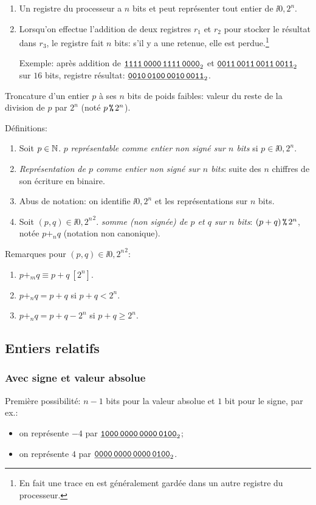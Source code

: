 \begin{enumerate}
\item Un registre du processeur a $n$ bits et peut
  représenter tout entier de $\ii{0,2^{n}}$.
\item Lorsqu'on effectue l'addition de deux registres $r_{1}$ et
  $r_{2}$ pour stocker le résultat dans $r_{3}$, le registre fait $n$
  bits: s'il y a une retenue, elle est perdue.\footnote{En fait une
    trace en est généralement gardée dans un autre registre du
    processeur.}

  Exemple: après addition de $\underline{\text{\texttt{1111\,0000\,1111\,0000}}}_{2}$ et
  $\underline{\text{\texttt{0011\,0011\,0011\,0011}}}_{2}$ sur $16$ bits, registre résultat:
  $\underline{\text{\texttt{0010\,0100\,0010\,0011}}}_{2}$.
\end{enumerate}

Troncature d'un entier $p$ à ses $n$ bits de poids faibles: valeur du
reste de la division de $p$ par $2^{n}$ (noté $p \operatorname{\texttt{\%}} 2^{n}$).

Définitions:
\begin{enumerate}
\item Soit $p\in\mathbb{N}$. $p$ \emph{représentable comme
    entier non signé sur $n$ bits} si $p\in\ii{0,2^{n}}$.
\item \emph{Représentation de $p$ comme entier non signé sur $n$
    bits}:
  suite des $n$ chiffres de son écriture en binaire.
\item Abus de notation: on identifie $\ii{0,2^{n}}$ et les
  représentations sur $n$ bits.
\item Soit $(p,q)\in \ii{0,2^{n}}^{2}$.
  \emph{somme (non signée) de $p$ et $q$ sur $n$ bits}: $(p+q) \operatorname{\texttt{\%}}
  2^{n}$, notée $p+_{n}q$ (notation non canonique).
\end{enumerate}

Remarques pour $(p,q)\in \ii{0,2^{n}}^{2}$:
  \begin{enumerate}
  \item $p+_{m}q \equiv p+q\ [2^{n}]$.
  \item $p+_{n}q = p+q$ si $p+q< 2^{n}$.
  \item $p+_{n}q = p+q - 2^{n}$ si $p+q \geq 2^{n}$.
  \end{enumerate}
\subsection{Entiers relatifs}

\subsubsection{Avec signe et valeur absolue}
Première possibilité: $n-1$ bits pour la valeur absolue et
$1$ bit pour le signe, par ex.:
\begin{itemize}
\item on représente $-4$ par $\underline{\text{\texttt{1000\,0000\,0000\,0100}}}_{2}$;
\item on représente $4$ par $\underline{\text{\texttt{0000\,0000\,0000\,0100}}}_{2}$.
\end{itemize}

